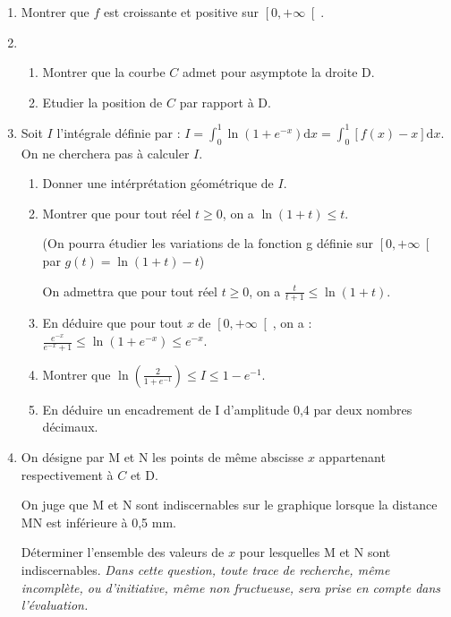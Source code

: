 \begin{center}

\end{center}
\begin{enumerate}
     \item
     Montrer que $f$ est croissante et positive sur $\left[0 , +\infty \right[$.
     \item
     \begin{enumerate}[label=\alph*.]
          \item
          Montrer que la courbe $C$ admet pour asymptote la droite D.
          \item
          Etudier la position de $C$ par rapport à D.
     \end{enumerate}
     \item
     Soit $I$ l'intégrale définie par : $I= \int_{0}^{1} \ln\left(1+e^{-x}\right) \text{d}x= \int_{0}^{1} \left[f\left(x\right)-x\right] \text{d}x $. On ne cherchera pas à calculer $I$.
     \begin{enumerate}[label=\alph*.]
          \item
          Donner une intérprétation géométrique de $I$.
          \item
          Montrer que pour tout réel $t \geqslant 0$, on a $\ln\left(1+t\right) \leqslant t$.
          \par
          (On pourra étudier les variations de la fonction g définie sur $\left[0,+\infty \right[$ par $g\left(t\right)=\ln\left(1+t\right)-t$)
          \par
          On admettra que pour tout réel $t \geqslant 0$, on a $\frac{t}{t+1} \leqslant \ln\left(1+t\right)$.
          \item
          En déduire que pour tout $x$ de $\left[0 , +\infty \right[$, on a : $\frac{e^{-x}}{e^{-x}+1} \leqslant \ln\left(1+e^{-x}\right) \leqslant e^{-x}$.
          \item
          Montrer que $\ln\left(\frac{2}{1+e^{-1}}\right) \leqslant I \leqslant 1-e^{-1}$.
          \item
          En déduire un encadrement de I d'amplitude 0,4 par deux nombres décimaux.
     \end{enumerate}
     \item
     On désigne par M et N les points de même abscisse $x$ appartenant respectivement à $C$ et D.
     \par
     On juge que M et N sont indiscernables sur le graphique lorsque la distance MN est inférieure à 0,5 mm.
     \par
     Déterminer l'ensemble des valeurs de $x$ pour lesquelles M et N sont indiscernables.
     \textit{Dans cette question, toute trace de recherche, même incomplète, ou d'initiative, même non fructueuse, sera prise en compte dans l'évaluation.}
\end{enumerate}
\begin{corrige}

\end{corrige}

